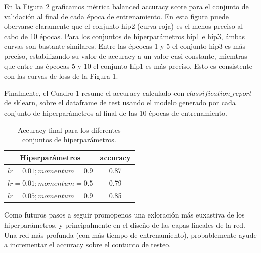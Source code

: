 \documentclass[a4paper,10pt]{article}
\begin{document}
En la Figura 2 graficamos métrica balanced accuracy score para el conjunto de validación al final de cada época de entrenamiento. En esta figura puede obervarse claramente que el conjunto hip2 (curva roja) es el menos preciso al cabo de 10 épocas. Para los conjuntos de hiperparámetros hip1 e hip3, ámbas curvas son bastante similares. Entre las épcocas 
1 y 5 el conjunto hip3 es más preciso, estabilizando su valor de accuracy a un valor casi constante, miemtras que entre las épcocas 5 y 10 el conjunto hip1 es más preciso. Esto es consistente con las curvas de loss de la Figura 1.

Finalmente, el Cuadro 1 resume el accuracy calculado con $classification\_report$ de sklearn, sobre el dataframe de test usando el modelo generado por cada conjunto de hiperparámetros al final de las 10 épocas de entrenamiento.
\begin{table}[h]
\caption{Accuracy final para los diferentes conjuntos de hiperparámetros.}\label{tab:data}
\begin{tabular}{cc}
\hline
Hiperparámetros  & accuracy \\
\hline
\hline
$lr=0.01; momentum=0.9$ &  0.87\\
$lr=0.01; momentum=0.5$ &  0.79\\
$lr=0.05; momentum=0.9$ &  0.85
\end{tabular}
\end{table}

Como futuros pasos a seguir promopenos una exloración más euxastiva de los hiperparámetros, y principalmente en el diseño de las capas lineales de la red. Una red más profunda (con más tiempo de entrenamiento), probablemente ayude a incrementar el accuracy sobre el contunto de testeo.
\end{document}
